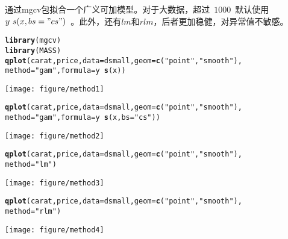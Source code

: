 \documentclass{article}\usepackage[]{graphicx}\usepackage[]{color}
\makeatletter
\def\maxwidth{ %
  \ifdim\Gin@nat@width>\linewidth
    \linewidth
  \else
    \Gin@nat@width
  \fi
}
\newcommand{\hlstr}[1]{\textcolor[rgb]{0.192,0.494,0.8}{#1}}%
\newcommand{\hlopt}[1]{\textcolor[rgb]{0,0,0}{#1}}%
\newcommand{\hlstd}[1]{\textcolor[rgb]{0.345,0.345,0.345}{#1}}%
\newcommand{\hlkwc}[1]{\textcolor[rgb]{0.333,0.667,0.333}{#1}}%
\newcommand{\hlkwd}[1]{\textcolor[rgb]{0.737,0.353,0.396}{\textbf{#1}}}%
\newenvironment{kframe}{%
 \def\at@end@of@kframe{}%
 \ifinner\ifhmode%
  \def\at@end@of@kframe{\end{minipage}}%
  \begin{minipage}{\columnwidth}%
 \fi\fi%
 \def\FrameCommand##1{\hskip\@totalleftmargin \hskip-\fboxsep
 \colorbox{shadecolor}{##1}\hskip-\fboxsep
     \hskip-\linewidth \hskip-\@totalleftmargin \hskip\columnwidth}%
 \MakeFramed {\advance\hsize-\width
   \@totalleftmargin\z@ \linewidth\hsize
   \@setminipage}}%
 {\par\unskip\endMakeFramed%
 \at@end@of@kframe}
\newenvironment{knitrout}{}{} %
\makeatother
\begin{document}
\begin{CJK*}{UTF8}{gkai}
\begin{knitrout}
\end{knitrout}
通过mgcv包拟合一个广义可加模型。对于大数据，超过~$1000$~默认使用~$y~s(x, bs = "cs")$~。此外，还有$lm$和$rlm$，后者更加稳健，对异常值不敏感。
\begin{knitrout}
\color{fgcolor}\begin{kframe}
\begin{alltt}
\hlkwd{library}\hlstd{(mgcv)}
\hlkwd{library}\hlstd{(MASS)}
\hlkwd{qplot}\hlstd{(carat, price,} \hlkwc{data} \hlstd{= dsmall,} \hlkwc{geom} \hlstd{=} \hlkwd{c}\hlstd{(}\hlstr{"point"}\hlstd{,} \hlstr{"smooth"}\hlstd{),}
      \hlkwc{method} \hlstd{=} \hlstr{"gam"}\hlstd{,} \hlkwc{formula} \hlstd{= y} \hlopt{~} \hlkwd{s}\hlstd{(x))}
\end{alltt}
\end{kframe}
\texttt{[image: figure/method1]} 
\begin{kframe}\begin{alltt}
\hlkwd{qplot}\hlstd{(carat, price,} \hlkwc{data} \hlstd{= dsmall,} \hlkwc{geom} \hlstd{=} \hlkwd{c}\hlstd{(}\hlstr{"point"}\hlstd{,} \hlstr{"smooth"}\hlstd{),}
      \hlkwc{method} \hlstd{=} \hlstr{"gam"}\hlstd{,} \hlkwc{formula} \hlstd{= y} \hlopt{~} \hlkwd{s}\hlstd{(x,} \hlkwc{bs} \hlstd{=} \hlstr{"cs"}\hlstd{))}
\end{alltt}
\end{kframe}
\texttt{[image: figure/method2]} 
\begin{kframe}\begin{alltt}
\hlkwd{qplot}\hlstd{(carat, price,} \hlkwc{data} \hlstd{= dsmall,} \hlkwc{geom} \hlstd{=} \hlkwd{c}\hlstd{(}\hlstr{"point"}\hlstd{,} \hlstr{"smooth"}\hlstd{),}
      \hlkwc{method} \hlstd{=} \hlstr{"lm"}\hlstd{)}
\end{alltt}
\end{kframe}
\texttt{[image: figure/method3]} 
\begin{kframe}\begin{alltt}
\hlkwd{qplot}\hlstd{(carat, price,} \hlkwc{data} \hlstd{= dsmall,} \hlkwc{geom} \hlstd{=} \hlkwd{c}\hlstd{(}\hlstr{"point"}\hlstd{,} \hlstr{"smooth"}\hlstd{),}
      \hlkwc{method} \hlstd{=} \hlstr{"rlm"}\hlstd{)}
\end{alltt}
\end{kframe}
\texttt{[image: figure/method4]} 


\end{knitrout}
\end{CJK*}
\end{document}
